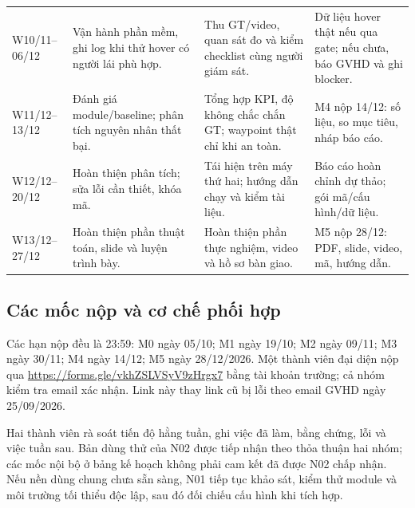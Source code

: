 \documentclass[a4paper,12pt]{article}
\begin{document}
\begin{longtable}{L{1.8cm}L{4.1cm}L{4.1cm}L{3.7cm}}
W10/11–06/12 & Vận hành phần mềm, ghi log khi thử hover có người lái phù hợp. & Thu GT/video, quan sát đo và kiểm checklist cùng người giám sát. & Dữ liệu hover thật nếu qua gate; nếu chưa, báo GVHD và ghi blocker.\\
W11/12–13/12 & Đánh giá module/baseline; phân tích nguyên nhân thất bại. & Tổng hợp KPI, độ không chắc chắn GT; waypoint thật chỉ khi an toàn. & M4 nộp 14/12: số liệu, so mục tiêu, nháp báo cáo.\\
W12/12–20/12 & Hoàn thiện phân tích; sửa lỗi cần thiết, khóa mã. & Tái hiện trên máy thứ hai; hướng dẫn chạy và kiểm tài liệu. & Báo cáo hoàn chỉnh dự thảo; gói mã/cấu hình/dữ liệu.\\
W13/12–27/12 & Hoàn thiện phần thuật toán, slide và luyện trình bày. & Hoàn thiện phần thực nghiệm, video và hồ sơ bàn giao. & M5 nộp 28/12: PDF, slide, video, mã, hướng dẫn.\\
\bottomrule
\end{longtable}\endgroup

\subsection{Các mốc nộp và cơ chế phối hợp}
Các hạn nộp đều là 23:59: M0 ngày 05/10; M1 ngày 19/10; M2 ngày 09/11; M3 ngày 30/11; M4 ngày 14/12; M5 ngày 28/12/2026\cite{assignment}. Một thành viên đại diện nộp qua \url{https://forms.gle/vkhZSLVSyV9zHrgx7} bằng tài khoản trường; cả nhóm kiểm tra email xác nhận. Link này thay link cũ bị lỗi theo email GVHD ngày 25/09/2026\cite{formmail}.

Hai thành viên rà soát tiến độ hằng tuần, ghi việc đã làm, bằng chứng, lỗi và việc tuần sau. Bản dùng thử của N02 được tiếp nhận theo thỏa thuận hai nhóm; các mốc nội bộ ở bảng kế hoạch không phải cam kết đã được N02 chấp nhận. Nếu nền dùng chung chưa sẵn sàng, N01 tiếp tục khảo sát, kiểm thử module và môi trường tối thiểu độc lập, sau đó đối chiếu cấu hình khi tích hợp.
\end{document}
